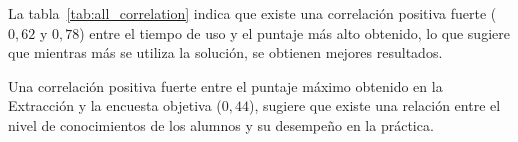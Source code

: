 La tabla~\ref{tab:all_correlation} indica que existe una correlación positiva
fuerte ($0,62$ y $0,78$) entre el tiempo de uso y el puntaje más alto obtenido,
lo que sugiere que mientras más se utiliza la solución, se obtienen mejores
resultados. 

Una correlación positiva fuerte entre el puntaje máximo obtenido en la
Extracción y la encuesta objetiva ($0,44$), sugiere que existe una relación entre
el nivel de conocimientos de los alumnos y su desempeño en la práctica.


